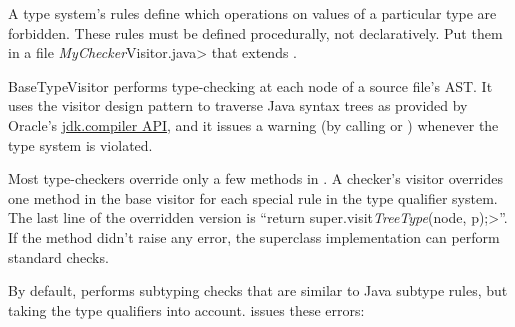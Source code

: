 


A type system's rules define which operations on values of a
particular type are forbidden.
These rules must be defined procedurally, not declaratively.
Put them in a file \<\emph{MyChecker}Visitor.java> that extends
.

BaseTypeVisitor performs type-checking at each node of a
source file's AST\@.  It uses the visitor design pattern to traverse
Java syntax trees as provided by Oracle's
\href{https://docs.oracle.com/en/java/javase/17/docs/api/jdk.compiler/module-summary.html}{jdk.compiler
API},
and it issues a warning (by calling
or
)
whenever the type system is violated.

Most type-checkers
override only a few methods in .
A checker's visitor overrides one method in the base visitor for each special
rule in the type qualifier system.
The last line of the overridden version is
``\<return super.visit\emph{TreeType}(node, p);>''.
If the method didn't raise any error,
the superclass implementation can perform standard checks.


By default,  performs subtyping checks that are
similar to Java subtype rules, but taking the type qualifiers into account.
 issues these errors:

